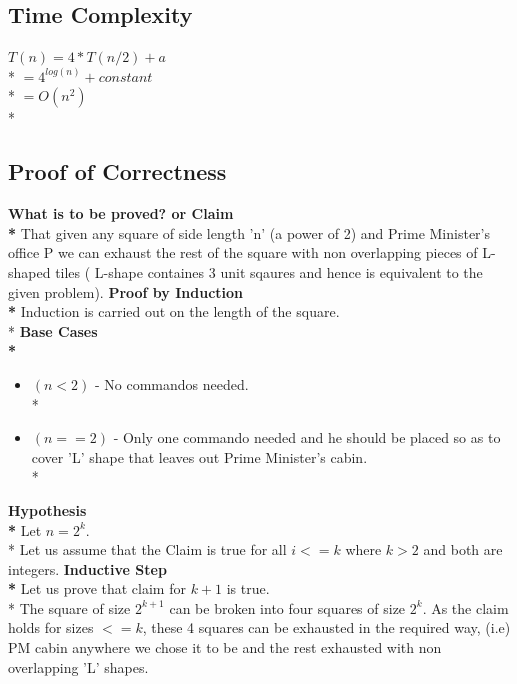 \documentclass{article}
\begin{document}
\begin{itemize}
\subsection{Time Complexity}
\begin{center}
$ T(n) = 4*T(n/2) + a $ \\*
$ = 4^{log(n)} + constant $ \\*
$ = O(n^2) $ \\*
\end{center}
\subsection{Proof of Correctness}
{\bf What is to be proved? or Claim \\*}
That given any square of side length 'n' (a power of 2)  and Prime Minister's office P we can exhaust the rest of the square with non overlapping pieces of L-shaped tiles ( L-shape containes 3 unit sqaures and hence is equivalent to the given problem).  
{\bf Proof by Induction \\*}
Induction is carried out on the length of the square. \\*
{\bf Base Cases \\*}
\begin{itemize}
\item $(n<2)$ - No commandos needed. \\*
\item $(n==2)$ - Only one commando needed and he should be placed so as to cover 'L' shape that leaves out Prime Minister's cabin. \\*
\end{itemize}
{\bf Hypothesis \\*}
Let $ n = 2^{k} $. \\*
Let us assume that the Claim is true for all $i<=k$ where $k>2$ and both are integers.
{\bf Inductive Step \\*}
Let us prove that claim for $ k+1 $ is true. \\*
The square of size $2^{k+1}$ can be broken into four squares of size $2^{k}$. As the claim holds for sizes $<=k$, these 4 squares can be exhausted in the required way, (i.e) PM cabin anywhere we chose it to be and the rest exhausted with non overlapping 'L' shapes. 
\end{itemize}
\end{document}

